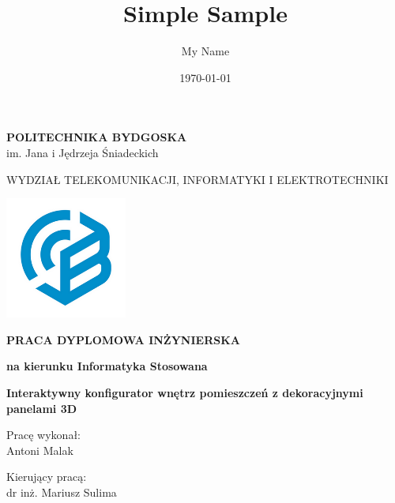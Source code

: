 \documentclass{article} %
\title{Simple Sample} %
\author{My Name} %
\date{\today} %
\begin{document}

\begin{center}
 \Large \textbf{POLITECHNIKA BYDGOSKA} \\
  im. Jana i Jędrzeja Śniadeckich \\
\end{center}

\begin{center}
\end{center}

\begin{center}
 \LARGE WYDZIAŁ TELEKOMUNIKACJI, INFORMATYKI I ELEKTROTECHNIKI \\
\end{center}

\begin{center}
 \includegraphics[width=4cm,height=4cm]{logo.png}
\end{center}

\begin{center}
 \Large \textbf{PRACA DYPLOMOWA INŻYNIERSKA}
\end{center}

\begin{center}
 \large \textbf{na kierunku Informatyka Stosowana}
\end{center}

\vspace{3cm}

\begin{center}
 \LARGE \textbf{Interaktywny konfigurator wnętrz pomieszczeń z dekoracyjnymi panelami 3D}
\end{center}

\vspace{3cm}

\begin{minipage}{2in}
Pracę wykonał: \\
Antoni Malak\\
\end{minipage}
\hfill
\begin{minipage}{1.3in}
Kierujący pracą: \\
dr inż. Mariusz Sulima
\end{minipage}
\end{document}
